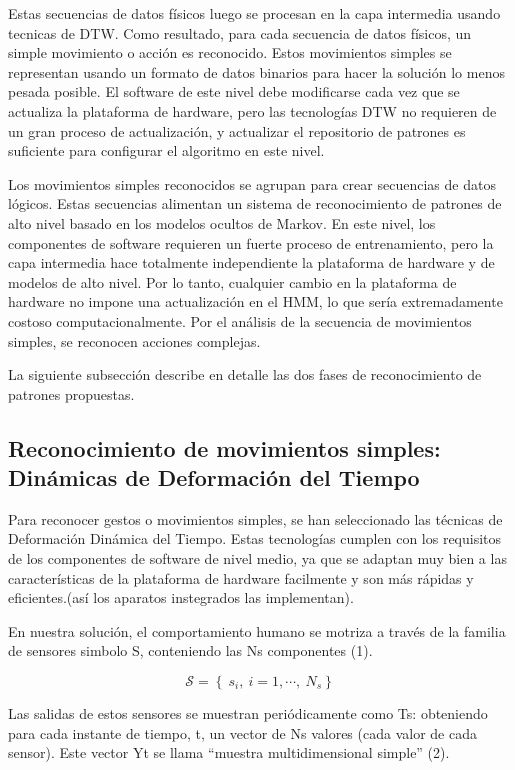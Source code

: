 \documentclass{article}
\begin{document}
  Estas secuencias de datos físicos luego se procesan en la capa intermedia usando tecnicas de DTW. Como resultado, para cada secuencia de datos físicos, un simple movimiento o acción es reconocido. Estos movimientos simples se representan usando un formato de datos binarios para hacer la solución lo menos pesada posible. El software de este nivel debe modificarse cada vez que se actualiza la plataforma de hardware, pero las tecnologías DTW no requieren de un gran proceso de actualización, y actualizar el repositorio de patrones es suficiente para configurar el
algoritmo en este nivel.

  Los movimientos simples reconocidos se agrupan para crear secuencias de datos lógicos. Estas secuencias alimentan un sistema de reconocimiento de patrones de alto nivel basado en los modelos ocultos de Markov. En este nivel, los componentes de software requieren un fuerte proceso de entrenamiento, pero la capa intermedia hace totalmente independiente la plataforma de hardware y de modelos de alto nivel. Por lo tanto, cualquier cambio en la plataforma de hardware no impone una actualización en el HMM, lo que sería extremadamente costoso computacionalmente. Por el análisis de
la secuencia de movimientos simples, se reconocen acciones complejas.

  La siguiente subsección describe en detalle las dos fases de reconocimiento de patrones propuestas.

\subsection{Reconocimiento de movimientos simples: Dinámicas de Deformación del Tiempo}

  Para reconocer gestos o movimientos simples, se han seleccionado las técnicas de Deformación Dinámica del Tiempo. Estas tecnologías cumplen con los requisitos de los componentes de software de nivel medio, ya que se adaptan muy bien a las características de la plataforma de hardware facilmente y son más rápidas y eficientes.(así los aparatos instegrados las implementan).

  En nuestra solución, el comportamiento humano se motriza a través de la familia de sensores simbolo S, conteniendo las Ns componentes (1).

\begin{equation}
	\mathcal{S} =  \left\lbrace \ s_i,\ i=1,\cdots , \ N_s \right\rbrace
\end{equation}

  Las salidas de estos sensores se muestran periódicamente como Ts: obteniendo para cada instante de tiempo, t, un vector de  Ns valores (cada valor de cada sensor). Este vector  Yt se llama “muestra multidimensional simple” (2).
\end{document}
